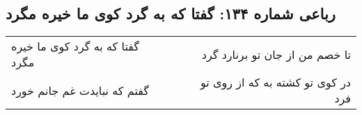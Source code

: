 \begin{center}
\section*{رباعی شماره ۱۳۴: گفتا که به گرد کوی ما خیره مگرد}
\label{sec:sh134}
\begin{longtable}{l p{0.5cm} r}
گفتا که به گرد کوی ما خیره مگرد
&&
تا خصم من از جان تو برنارد گرد
\\
گفتم که نبایدت غم جانم خورد
&&
در کوی تو کشته به که از روی تو فرد
\\
\end{longtable}
\end{center}
